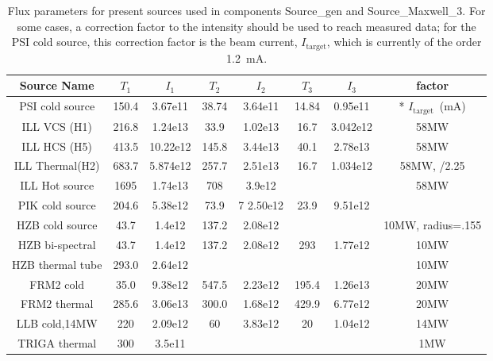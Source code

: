 \begin{table}
  \begin{center}
  {\let\my=\\
    \begin{tabular}{|c|cccccc|c|}
    \hline
    Source Name & $T_1$ & $I_1$ & $T_2$ & $I_2$ & $T_3$ & $I_3$ & factor \\
    \hline
    PSI cold source & 150.4  & 3.67e11   & 38.74 & 3.64e11    & 14.84& 0.95e11   & * $I_\textrm{target}$~(mA)\\
    ILL VCS (H1)    & 216.8  & 1.24e13   & 33.9  & 1.02e13    & 16.7 & 3.042e12  &58MW\\
    ILL HCS (H5)    & 413.5  & 10.22e12  & 145.8 & 3.44e13    & 40.1 & 2.78e13   &58MW\\
    ILL Thermal(H2) & 683.7  & 5.874e12  & 257.7 & 2.51e13    & 16.7 & 1.034e12  &58MW, /2.25\\
    ILL Hot source  & 1695   & 1.74e13   & 708   & 3.9e12     &      &           &58MW\\ 
    PIK cold source & 204.6  & 5.38e12   & 73.9  & 7 2.50e12  & 23.9 & 9.51e12   &\\
    HZB cold source & 43.7   & 1.4e12    & 137.2 & 2.08e12    &      &           &10MW, radius=.155\\
    HZB bi-spectral & 43.7   & 1.4e12    & 137.2 & 2.08e12    & 293  & 1.77e12   &10MW\\
    HZB thermal tube& 293.0  & 2.64e12   &       &            &      &           &10MW\\
    FRM2 cold       & 35.0   & 9.38e12   & 547.5 & 2.23e12    & 195.4&  1.26e13  &20MW\\
    FRM2 thermal    & 285.6  &  3.06e13  & 300.0 & 1.68e12    & 429.9&  6.77e12  &20MW\\
    LLB cold,14MW   & 220    & 2.09e12   & 60    & 3.83e12    & 20   & 1.04e12   &14MW\\
    TRIGA thermal   & 300    & 3.5e11    &       &            &      &           &1MW\\
    \hline
    \end{tabular}
    \caption{Flux parameters for present sources used in components
             Source\_gen and Source\_Maxwell\_3.
             For some cases, a correction factor to the intensity
             should be used to reach measured data; for the PSI cold source,
             this correction factor is the beam current, $I_\textrm{target}$,
             which is currently of the order 1.2~mA.
}
    \label{t:source_gen-params}
  }
  \end{center}
\end{table}
